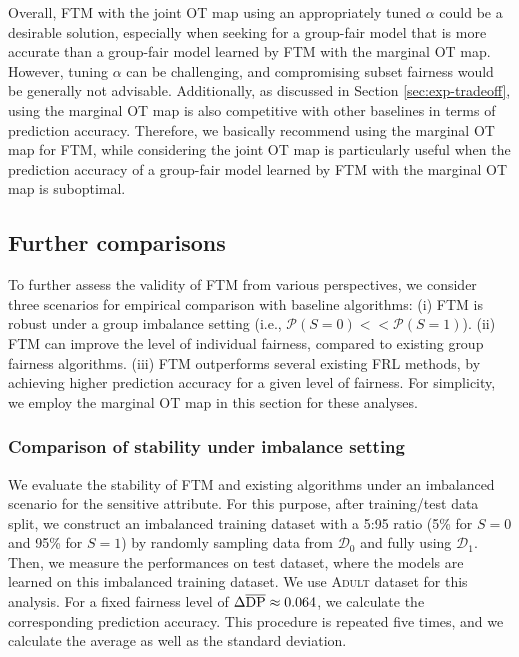 \documentclass[10pt]{article} %
\begin{document}
Overall, FTM with the joint OT map using an appropriately tuned $\alpha$ could be a desirable solution, especially when seeking for a group-fair model that is more accurate than a group-fair model learned by FTM with the marginal OT map.
However, tuning $\alpha$ can be challenging, and compromising subset fairness would be generally not advisable.
Additionally, as discussed in Section \ref{sec:exp-tradeoff}, using the marginal OT map is also competitive with other baselines in terms of prediction accuracy.
Therefore, we basically recommend using the marginal OT map for FTM, while considering the joint OT map is particularly useful when the prediction accuracy of a group-fair model learned by FTM with the marginal OT map is suboptimal.

\subsection{Further comparisons}\label{sec:add_exps}

To further assess the validity of FTM from various perspectives, we consider three scenarios for empirical comparison with baseline algorithms:
(i) FTM is robust under a group imbalance setting (i.e., $\mathcal{P}(S = 0) << \mathcal{P}(S = 1)$).
(ii) FTM can improve the level of individual fairness, compared to existing group fairness algorithms.
(iii) FTM outperforms several existing FRL methods, by achieving higher prediction accuracy for a given level of fairness.
For simplicity, we employ the marginal OT map in this section for these analyses.


\subsubsection{Comparison of stability under imbalance setting}\label{sec:add_exps_imbalance}

We evaluate the stability of FTM and existing algorithms under an imbalanced scenario for the sensitive attribute.
For this purpose, after training/test data split, we construct an imbalanced training dataset with a 5:95 ratio (5\% for $S=0$ and 95\% for $S=1$) by randomly sampling data from $\mathcal{D}_{0}$ and fully using $\mathcal{D}_{1}.$
Then, we measure the performances on test dataset, where the models are learned on this imbalanced training dataset.
We use \textsc{Adult} dataset for this analysis.
For a fixed fairness level of $\Delta \overline{\textup{DP}} \approx 0.064$, we calculate the corresponding prediction accuracy.
This procedure is repeated five times, and we calculate the average as well as the standard deviation.
\end{document}
